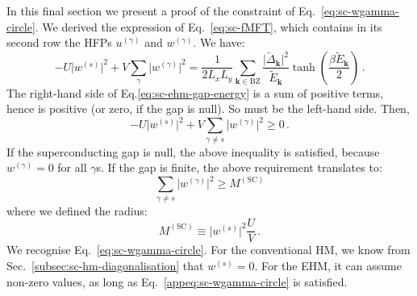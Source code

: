 In this final section we present a proof of the constraint of Eq.~\eqref{eq:sc-wgamma-circle}. We derived the expression of Eq.~\eqref{eq:sc-fMFT}, which contains in its second row the HFPs $u^{(\gamma)}$ and $w^{(\gamma)}$. We have:
\begin{equation}\label{eq:sc-ehm-gap-energy}
	-U \big|
	w^{(s)}
	\big|^2 + V \sum_\gamma \big|
	w^{(\gamma)}
	\big|^2 = \frac{1}{2L_x L_y} \sum_{\mathbf{k}\in\mathrm{BZ}} \frac{\big| \tilde{\Delta}_\mathbf{k} \big|^2 }{\tilde{E}_\mathbf{k}} \tanh(\frac{\beta\tilde{E}_\mathbf{k}}{2}) \, .
\end{equation}
The right-hand side of Eq.\eqref{eq:sc-ehm-gap-energy} is a sum of positive terms, hence is positive (or zero, if the gap is null). So must be the left-hand side. Then,
\[
	-U \big|
	w^{(s)}
	\big|^2 + V \sum_{\gamma\neq s} \big|
	w^{(\gamma)}
	\big|^2 \ge 0 \, .
\]
If the superconducting gap is null, the above inequality is satisfied, because $w^{(\gamma)}=0$ for all $\gamma$s. If the gap is finite, the above requirement translates to:
\begin{equation}\label{appeq:sc-wgamma-circle}
	\sum_{\gamma \neq s} \big| w^{(\gamma)} \big|^2 \ge M^{(\mathrm{SC})}
\end{equation}
where we defined the radius:
\[
	M^{(\mathrm{SC})} \equiv \big| w^{(s)} \big|^2 \frac U V \, .
\]
We recognise Eq.~\eqref{eq:sc-wgamma-circle}. For the conventional HM, we know from Sec.~\ref{subsec:sc-hm-diagonalisation} that $w^{(s)}=0$. For the EHM, it can assume non-zero values, as long as Eq.~\eqref{appeq:sc-wgamma-circle} is satisfied.

